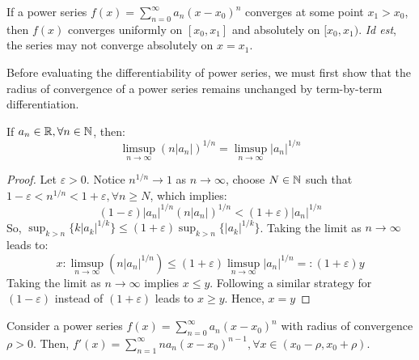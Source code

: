 \begin{remark}
    If a power series $f(x) = \sum_{n=0}^\infty a_n (x - x_0)^n$ converges at some point $x_1 > x_0$, then $f(x)$ converges uniformly on $[x_0, x_1]$ and absolutely on $[x_0, x_1)$. \emph{Id est}, the series may not converge absolutely on $x = x_1$.
\end{remark}

Before evaluating the differentiability of power series, we must first show that the radius of convergence of a power series remains unchanged by term-by-term differentiation.

\begin{lemma}
    \label{lemma:limsup_power_series_derivative}
    If $a_n \in \mathbb{R}, \forall n \in \mathbb{N}$, then:
    \begin{equation*}
        \limsup\limits_{n\to \infty} (n|a_n|)^{1/n} = \limsup \limits_{n \to \infty}|a_n|^{1/n}
    \end{equation*}
\end{lemma}

\begin{proof}
    Let $\varepsilon > 0$. Notice $n^{1/n} \to 1$ as $n \to \infty$, choose $N \in \mathbb{N}$ such that $1 - \varepsilon < n^{1/n} < 1 + \varepsilon, \forall n \geq N$, which implies:
    \begin{equation*}
        (1 - \varepsilon)|a_n|^{1/n} (n|a_n|)^{1/n} < (1 + \varepsilon)|a_n|^{1/n}
    \end{equation*}
    So, $\sup_{k > n}\{ k |a_k|^{1/k}\} \leq (1 + \varepsilon)\sup_{k > n} \{|a_k|^{1/k}\}$. Taking the limit as $n \to \infty$ leads to:
    \begin{equation*}
        x: \limsup \limits_{n \to \infty} (n |a_n|^{1/n}) \leq (1+\varepsilon)\limsup \limits_{n \to \infty} |a_n|^{1/n} =: (1+\varepsilon)y
    \end{equation*}
    Taking the limit as $n \to \infty$ implies $x \leq y$. Following a similar strategy for $(1-\varepsilon)$ instead of $(1+\varepsilon)$ leads to $x \geq y$. Hence, $x = y$
\end{proof}

\begin{theorem}
    Consider a power series $f(x) = \sum_{n=0}^\infty a_n(x - x_0)^n$ with radius of convergence $\rho >0$. Then, $f'(x) = \sum_{n=1}^\infty n a_n (x - x_0)^{n-1}, \forall x \in (x_0 - \rho, x_0 + \rho)$.
\end{theorem}

